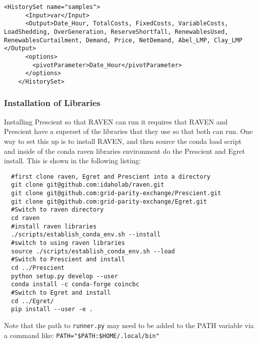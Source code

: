 \begin{lstlisting}[style=XML]
    <HistorySet name="samples">
      <Input>var</Input>
      <Output>Date_Hour, TotalCosts, FixedCosts, VariableCosts, LoadShedding, OverGeneration, ReserveShortfall, RenewablesUsed, RenewablesCurtailment, Demand, Price, NetDemand, Abel_LMP, Clay_LMP </Output>
      <options>
        <pivotParameter>Date_Hour</pivotParameter>
      </options>
    </HistorySet>
\end{lstlisting}


\subsubsection{Installation of Libraries}

Installing Prescient so that RAVEN can run it requires that RAVEN and
Prescient have a superset of the libraries that they use so that both
can run.  One way to set this up is to install RAVEN, and then source
the conda load script and inside of the conda raven libraries
environment do the Prescient and Egret install.  This is shown in the
following listing:

\begin{lstlisting}
  #first clone raven, Egret and Prescient into a directory
  git clone git@github.com:idaholab/raven.git
  git clone git@github.com:grid-parity-exchange/Prescient.git
  git clone git@github.com:grid-parity-exchange/Egret.git
  #Switch to raven directory
  cd raven
  #install raven libraries
  ./scripts/establish_conda_env.sh --install
  #switch to using raven libraries
  source ./scripts/establish_conda_env.sh --load
  #Switch to Prescient and install
  cd ../Prescient
  python setup.py develop --user
  conda install -c conda-forge coincbc
  #Switch to Egret and install
  cd ../Egret/
  pip install --user -e .
\end{lstlisting}

Note that the path to \texttt{runner.py} may need to be added to the PATH variable via a command like: \verb'PATH="$PATH:$HOME/.local/bin"'

